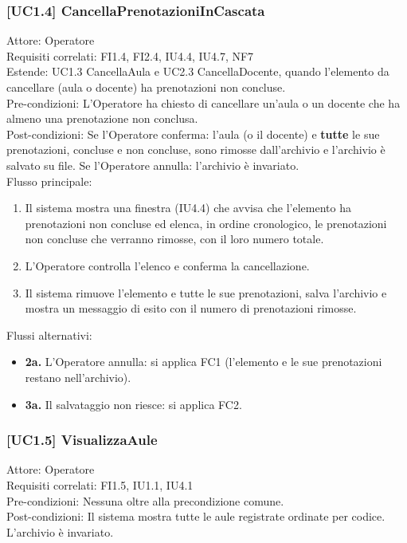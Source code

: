 \subsubsection{[UC1.4] CancellaPrenotazioniInCascata}
\noindent Attore: Operatore\\
Requisiti correlati: FI1.4, FI2.4, IU4.4, IU4.7, NF7\\
Estende: UC1.3 CancellaAula e UC2.3 CancellaDocente, quando l'elemento da cancellare (aula o docente) ha prenotazioni non concluse.\\
Pre-condizioni: L'Operatore ha chiesto di cancellare un'aula o un docente che ha almeno una prenotazione non conclusa.\\
Post-condizioni: Se l'Operatore conferma: l'aula (o il docente) e \textbf{tutte} le sue prenotazioni, concluse e non concluse, sono rimosse dall'archivio e l'archivio è salvato su file. Se l'Operatore annulla: l'archivio è invariato.\\

\noindent Flusso principale:
\begin{enumerate}
\item Il sistema mostra una finestra (IU4.4) che avvisa che l'elemento ha prenotazioni non concluse ed elenca, in ordine cronologico, le prenotazioni non concluse che verranno rimosse, con il loro numero totale.
\item L'Operatore controlla l'elenco e conferma la cancellazione.
\item Il sistema rimuove l'elemento e tutte le sue prenotazioni, salva l'archivio e mostra un messaggio di esito con il numero di prenotazioni rimosse.
\end{enumerate}
\noindent Flussi alternativi:
\begin{itemize}
\item \textbf{2a.} L'Operatore annulla: si applica FC1 (l'elemento e le sue prenotazioni restano nell'archivio).
\item \textbf{3a.} Il salvataggio non riesce: si applica FC2.
\end{itemize}

\subsubsection{[UC1.5] VisualizzaAule}
\noindent Attore: Operatore\\
Requisiti correlati: FI1.5, IU1.1, IU4.1\\
Pre-condizioni: Nessuna oltre alla precondizione comune.\\
Post-condizioni: Il sistema mostra tutte le aule registrate ordinate per codice. L'archivio è invariato.\\

